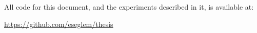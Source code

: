 

All code for this document, and the experiments described in it, is available at:

\url{https://github.com/eseglem/thesis}
